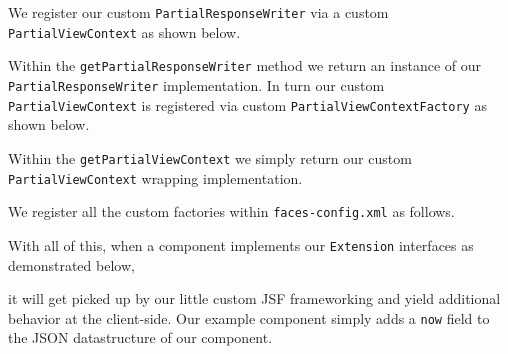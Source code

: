 We register our custom \texttt{PartialResponseWriter} via a custom \texttt{PartialViewContext} as shown below.

Within the \texttt{getPartialResponseWriter} method we return an instance of our \texttt{Partial\allowbreak ResponseWriter} implementation.
In turn our custom \texttt{PartialViewContext} is registered via custom \texttt{PartialViewContextFactory} as shown below.

Within the \texttt{getPartialViewContext} we simply return our custom \texttt{PartialViewContext} wrapping implementation.

We register all the custom factories within \texttt{faces-config.xml} as follows.


With all of this, when a component implements our \texttt{Extension} interfaces as demonstrated below,

it will get picked up by our little custom JSF frameworking and yield additional behavior at the client-side.
Our example component simply adds a \texttt{now} field to the JSON datastructure of our component.


